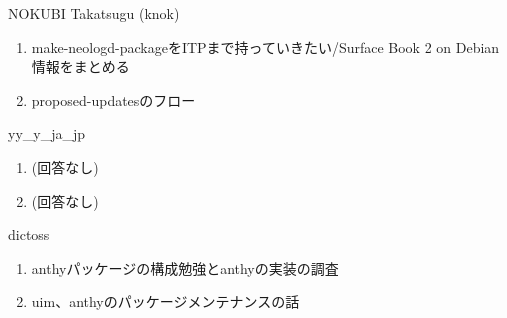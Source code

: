 \begin{prework}{ NOKUBI Takatsugu (knok) }
  \begin{enumerate}
  \item make-neologd-packageをITPまで持っていきたい/Surface Book 2 on Debian情報をまとめる
  \item proposed-updatesのフロー
  \end{enumerate}
\end{prework}

\begin{prework}{ yy\_y\_ja\_jp }
  \begin{enumerate}
  \item (回答なし)
  \item (回答なし)
  \end{enumerate}
\end{prework}

\begin{prework}{ dictoss }
  \begin{enumerate}
  \item anthyパッケージの構成勉強とanthyの実装の調査
  \item uim、anthyのパッケージメンテナンスの話
  \end{enumerate}
\end{prework}
